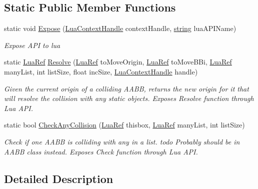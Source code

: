 \subsection*{Static Public Member Functions}
\begin{DoxyCompactItemize}
\item 
static void \hyperlink{class_island_collision_a_p_i_a408d5f8a742dc547190f764a44adc959}{Expose} (\hyperlink{_lua_context_8h_a2ffcc2d3ed21165072a1d7b61259bf14}{Lua\+Context\+Handle} context\+Handle, \hyperlink{_types_8h_ad453f9f71ce1f9153fb748d6bb25e454}{string} lua\+A\+P\+I\+Name)
\begin{DoxyCompactList}\small\item\em Expose A\+PI to lua \end{DoxyCompactList}\item 
static \hyperlink{_lua_context_8h_a2220f03700ba40e366f0ee2d684d5c91}{Lua\+Ref} \hyperlink{class_island_collision_a_p_i_a423b5b49def4da4c8bd11f471f154944}{Resolve} (\hyperlink{_lua_context_8h_a2220f03700ba40e366f0ee2d684d5c91}{Lua\+Ref} to\+Move\+Origin, \hyperlink{_lua_context_8h_a2220f03700ba40e366f0ee2d684d5c91}{Lua\+Ref} to\+Move\+B\+Bi, \hyperlink{_lua_context_8h_a2220f03700ba40e366f0ee2d684d5c91}{Lua\+Ref} many\+List, int list\+Size, float inc\+Size, \hyperlink{_lua_context_8h_a2ffcc2d3ed21165072a1d7b61259bf14}{Lua\+Context\+Handle} handle)
\begin{DoxyCompactList}\small\item\em Given the current origin of a colliding A\+A\+BB, returns the new origin for it that will resolve the collision with any static objects. Exposes Resolve function through Lua A\+PI. \end{DoxyCompactList}\item 
static bool \hyperlink{class_island_collision_a_p_i_a34492efcd49f8c80861bee4a7af984ce}{Check\+Any\+Collision} (\hyperlink{_lua_context_8h_a2220f03700ba40e366f0ee2d684d5c91}{Lua\+Ref} thisbox, \hyperlink{_lua_context_8h_a2220f03700ba40e366f0ee2d684d5c91}{Lua\+Ref} many\+List, int list\+Size)
\begin{DoxyCompactList}\small\item\em Check if one A\+A\+BB is colliding with any in a list. todo Probably should be in A\+A\+BB class instead. Exposes Check function through Lua A\+PI. \end{DoxyCompactList}\end{DoxyCompactItemize}


\subsection{Detailed Description}


